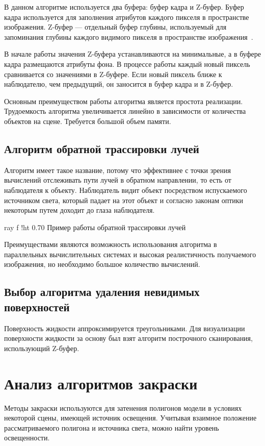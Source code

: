 В данном алгоритме используется два буфера: буфер кадра и Z-буфер. 
Буфер кадра используется для заполнения атрибутов каждого пикселя в пространстве изображения.  
Z-буфер --- отдельный буфер глубины, используемый для запоминания глубины каждого видимого пикселя в пространстве изображения~\cite{ROB}.

В начале работы значения Z-буфера устанавливаются на минимальные, а в буфере кадра размещаются атрибуты фона. 
В процессе работы каждый новый пиксель сравнивается со значениями в Z-буфере. 
Если новый пиксель ближе к наблюдателю, чем предыдущий, он заносится в буфер кадра и в Z-буфер. 

Основным преимуществом работы алгоритма является простота реализации. 
Трудоемкость алгоритма увеличивается линейно в зависимости от количества объектов на сцене. 
Требуется большой объем памяти.

\subsection{Алгоритм обратной трассировки лучей}

Алгоритм имеет такое название, потому что эффективнее с точки зрения вычислений отслеживать пути лучей в обратном направлении, то есть от наблюдателя к объекту. Наблюдатель видит объект посредством испускаемого источником света, который падает на этот объект и согласно законам оптики некоторым путем доходит до глаза наблюдателя. 

    {ray}
    {f}
    {!ht}
    {0.70\textwidth}
    {Пример работы обратной трассировки лучей}

Преимуществами являются возможность использования алгоритма в параллельных вычислительных системах и высокая реалистичность получаемого изображения, но необходимо большое количество вычислений.

\subsection{Выбор алгоритма удаления невидимых поверхностей}
Поверхность жидкости аппроксимируется треугольниками. 
Для визуализации поверхности жидкости за основу был взят 
алгоритм построчного сканирования, использующий Z-буфер. 

\newpage 

\section{Анализ алгоритмов закраски}
Методы закраски используются для затенения полигонов модели в условиях некоторой сцены,
имеющей источник освещения. 
Учитывая взаимное положение рассматриваемого полигона и источника света, можно найти уровень освещенности. 

